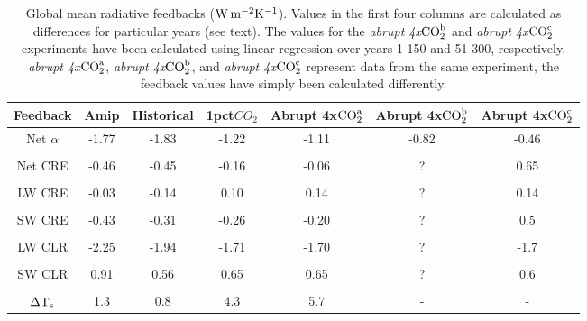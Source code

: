 \documentclass[draft]{agujournal2019}
\begin{document}
\begin{table}
\begin{center}
\caption{Global mean radiative feedbacks ($\rm{W\, m^{-2} K^{-1}}$).  Values in the first four columns are calculated as differences for 
particular years (see text).  The values for the \textit{abrupt 4x$\rm{CO}_2^{b}$} and  \textit{abrupt 4x$\rm{CO}_2^{c}$} experiments
have been calculated using linear regression over years 1-150 and 51-300, respectively.  
\textit{abrupt 4x$\rm{CO}_2^{a}$}, \textit{abrupt 4x$\rm{CO}_2^{b}$}, and \textit{abrupt 4x$\rm{CO}_2^{c}$} represent data from the same experiment, the feedback values have simply been calculated differently.
}
    \begin{tabular}{*{7}{c}}
    \hline
    \hline
 Feedback     &  Amip   & Historical   &  1pct$CO_2$ & Abrupt 4x$\rm{CO}_2^{a}$ &  Abrupt 4x$\rm{CO}_2^{b}$ &  Abrupt 4x$\rm{CO}_2^{c}$ \\ \hline
    Net $\alpha$    & -1.77      &   -1.83      &  -1.22          &  -1.11    &  -0.82   &   -0.46              \\ 
    \\
    Net CRE  &    -0.46            &   -0.45       &  -0.16          & -0.06   & ?      &   0.65         \\  
    \\
    LW CRE    &   -0.03           &   -0.14        &  0.10            & 0.14   &  ?        & 0.14          \\  
    \\
    SW CRE  &     -0.43             &    -0.31       &  -0.26            & -0.20    &  ?      &  0.5         \\  
    \\
    LW CLR   &     -2.25             &    -1.94       &  -1.71            & -1.70    &   ?      & -1.7        \\  
    \\
    SW CLR  &      0.91            &     0.56        & 0.65              & 0.65    &    ?         & 0.6          \\  
    \\
    $\Delta \rm{T}_s$     &     1.3     & 0.8        &  4.3           & 5.7     &   -         & -          \\  \hline

    \end{tabular}\par
    \label{tab:lambda_AOGCM}
\end{center}
\end{table}
\end{document}
